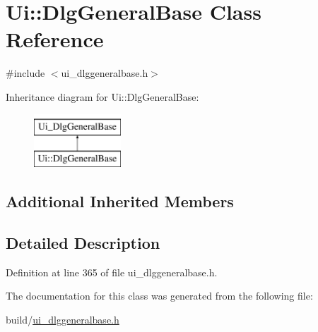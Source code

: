\hypertarget{classUi_1_1DlgGeneralBase}{\section{Ui\+:\+:Dlg\+General\+Base Class Reference}
\label{classUi_1_1DlgGeneralBase}
}


{\ttfamily \#include $<$ui\+\_\+dlggeneralbase.\+h$>$}

Inheritance diagram for Ui\+:\+:Dlg\+General\+Base\+:\begin{figure}[H]
\begin{center}
\leavevmode
\includegraphics[height=2.000000cm]{classUi_1_1DlgGeneralBase}
\end{center}
\end{figure}
\subsection*{Additional Inherited Members}


\subsection{Detailed Description}


Definition at line 365 of file ui\+\_\+dlggeneralbase.\+h.



The documentation for this class was generated from the following file\+:\begin{DoxyCompactItemize}
\item 
build/\hyperlink{ui__dlggeneralbase_8h}{ui\+\_\+dlggeneralbase.\+h}\end{DoxyCompactItemize}
